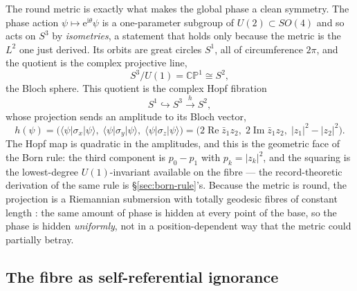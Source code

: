 The round metric is exactly what makes the global phase a clean symmetry. The
phase action $\psi\mapsto\mathrm{e}^{\mathrm{i}\theta}\psi$ is a one-parameter
subgroup of $U(2)\subset SO(4)$ and so acts on $S^{3}$ by \emph{isometries}, a
statement that holds only because the metric is the $L^{2}$ one just derived. Its
orbits are great circles $S^{1}$, all of circumference $2\pi$, and the quotient
is the complex projective line,
\begin{equation}
  S^{3}\big/U(1)=\mathbb{CP}^{1}\cong S^{2},
\end{equation}
the Bloch sphere. This quotient is the complex Hopf fibration
\autocite{Hopf1931, Urbantke2003, mosseri2001hopf}
\begin{equation}
  S^{1}\hookrightarrow S^{3}\xrightarrow{\;h\;}S^{2},
\end{equation}
whose projection sends an amplitude to its Bloch vector,
\begin{equation}
  h(\psi)=\bigl(\langle\psi\rvert\sigma_{x}\lvert\psi\rangle,\;
                 \langle\psi\rvert\sigma_{y}\lvert\psi\rangle,\;
                 \langle\psi\rvert\sigma_{z}\lvert\psi\rangle\bigr)
        =\bigl(2\operatorname{Re}\bar z_{1}z_{2},\;
               2\operatorname{Im}\bar z_{1}z_{2},\;
               \lvert z_{1}\rvert^{2}-\lvert z_{2}\rvert^{2}\bigr).
\end{equation}
The Hopf map is quadratic in the amplitudes, and this is the geometric face of the Born rule:
the third component is $p_{0}-p_{1}$ with $p_{k}=\lvert z_{k}\rvert^{2}$, and the squaring is the
lowest-degree $U(1)$-invariant available on the fibre --- the record-theoretic derivation of the
same rule is \S\ref{sec:born-rule}'s. Because the metric is round, the
projection is a Riemannian submersion with totally geodesic fibres of constant
length \autocite{GluckWarnerZiller1986}: the same amount of phase is hidden at
every point of the base, so the phase is hidden \emph{uniformly}, not in a
position-dependent way that the metric could partially betray.

\subsection{The fibre as self-referential ignorance}
\label{sec:fibre-self-ignorance}

